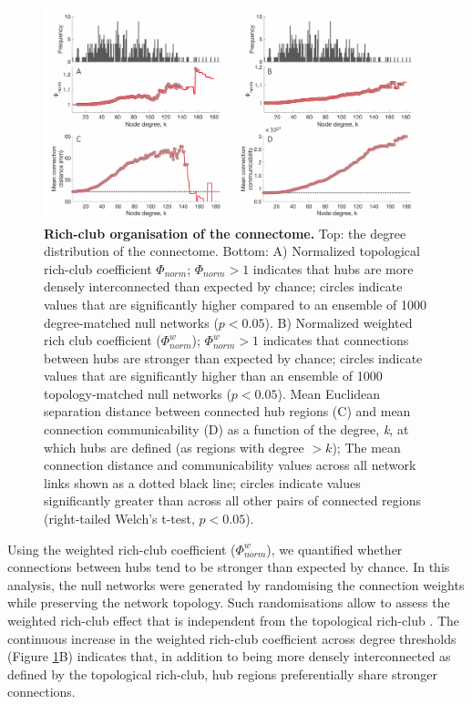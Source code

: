 \begin{figure}[h!]
\begin{center}
\includegraphics[width=1\textwidth]{Chapter5/Ch5Fig3.pdf}%
\end{center}
\caption{\textbf{Rich-club organisation of the connectome.} 
Top: the degree distribution of the connectome. Bottom: A) Normalized topological rich-club coefficient $\Phi_{norm}$; $\Phi_{norm} >1$ indicates that hubs are more densely interconnected than expected by chance; circles indicate values that are significantly higher compared to an ensemble of 1000 degree-matched null networks ($p < 0.05$). B) Normalized weighted rich club coefficient ($\Phi_{norm}^{w}$); $\Phi_{norm}^{w}>1$ indicates that connections between hubs are stronger than expected by chance; circles indicate values that are significantly higher than an ensemble of 1000 topology-matched null networks ($p < 0.05$). Mean Euclidean separation distance between connected hub regions (C) and mean connection communicability (D) as a function of the degree, \textit{k}, at which hubs are defined (as regions with degree $> k$); The mean connection distance and communicability values across all network links shown as a dotted black line; circles indicate values significantly greater than across all other pairs of connected regions (right-tailed Welch’s t-test, $p < 0.05$).}
\label{fig:Ch5Fig3}
\end{figure}

Using the weighted rich-club coefficient ($\Phi_{norm}^{w}$), we quantified whether connections between hubs tend to be stronger than expected by chance. In this analysis, the null networks were generated by randomising the connection weights while preserving the network topology. Such randomisations allow to assess the weighted rich-club effect that is independent from the topological rich-club \citep{Alstott2014}. The continuous increase in the weighted rich-club coefficient across degree thresholds (Figure \ref{fig:Ch5Fig3}B) indicates that, in addition to being more densely interconnected as defined by the topological rich-club, hub regions preferentially share stronger connections.


